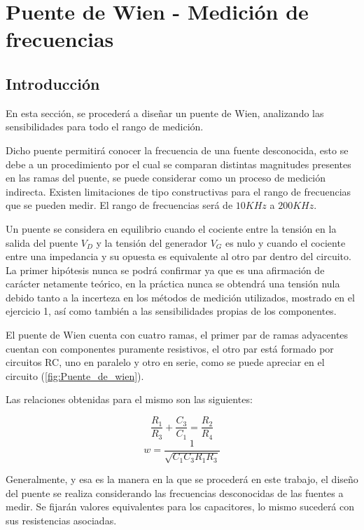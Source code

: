 


\section{Puente de Wien - Medición de frecuencias}

\subsection{Introducción}
En esta sección, se procederá a diseñar un puente de Wien, analizando las sensibilidades para todo el rango de medición. \par
Dicho puente permitirá conocer la frecuencia de una fuente desconocida, esto se debe a un procedimiento por el cual se comparan distintas magnitudes presentes en las ramas del puente, se puede considerar como un proceso de medición indirecta. Existen limitaciones de tipo constructivas para el rango de frecuencias que se pueden medir. El rango de frecuencias será de $10KHz$ a $200KHz$.\par
Un puente se considera en equilibrio cuando el cociente entre la tensión en la salida del puente $V_D$ y la tensión del generador $V_G$ es nulo y cuando el cociente entre una impedancia y su opuesta es equivalente al otro par dentro del circuito. La primer hipótesis nunca se podrá confirmar ya que es una afirmación de carácter netamente teórico, en la práctica nunca se obtendrá una tensión nula debido tanto a la incerteza en los métodos de medición utilizados, mostrado en el ejercicio 1, así como también a las sensibilidades propias de los componentes. \par
El puente de Wien cuenta con cuatro ramas, el primer par de ramas adyacentes cuentan con componentes puramente resistivos, el otro par está formado por circuitos RC, uno en paralelo y otro en serie, como se puede apreciar en el circuito (\ref{fig:Puente_de_wien}). \par
Las relaciones obtenidas para el mismo son las siguientes: \par
\begin{equation}
\frac{R_1}{R_3}+\frac{C_3}{C_1}=\frac{R_2}{R_4}
\end{equation}
\begin{equation}
w=\frac{1}{\sqrt{C_1C_3R_1R_3}}
\end{equation} \par
Generalmente, y esa es la manera en la que se procederá en este trabajo, el diseño del puente se realiza considerando las frecuencias desconocidas de las fuentes a medir. Se fijarán valores equivalentes para los capacitores, lo mismo sucederá con sus resistencias asociadas. 
